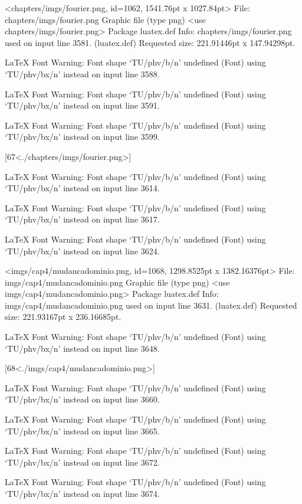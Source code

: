 <chapters/imgs/fourier.png, id=1062, 1541.76pt x 1027.84pt>
File: chapters/imgs/fourier.png Graphic file (type png)
<use chapters/imgs/fourier.png>
Package luatex.def Info: chapters/imgs/fourier.png  used on input line 3581.
(luatex.def)             Requested size: 221.91446pt x 147.94298pt.

LaTeX Font Warning: Font shape `TU/phv/b/n' undefined
(Font)              using `TU/phv/bx/n' instead on input line 3588.


LaTeX Font Warning: Font shape `TU/phv/b/n' undefined
(Font)              using `TU/phv/bx/n' instead on input line 3591.


LaTeX Font Warning: Font shape `TU/phv/b/n' undefined
(Font)              using `TU/phv/bx/n' instead on input line 3599.

[67<./chapters/imgs/fourier.png>]

LaTeX Font Warning: Font shape `TU/phv/b/n' undefined
(Font)              using `TU/phv/bx/n' instead on input line 3614.


LaTeX Font Warning: Font shape `TU/phv/b/n' undefined
(Font)              using `TU/phv/bx/n' instead on input line 3617.


LaTeX Font Warning: Font shape `TU/phv/b/n' undefined
(Font)              using `TU/phv/bx/n' instead on input line 3624.

<imgs/cap4/mudancadominio.png, id=1068, 1298.8525pt x 1382.16376pt>
File: imgs/cap4/mudancadominio.png Graphic file (type png)
<use imgs/cap4/mudancadominio.png>
Package luatex.def Info: imgs/cap4/mudancadominio.png  used on input line 3631.
(luatex.def)             Requested size: 221.93167pt x 236.16685pt.

LaTeX Font Warning: Font shape `TU/phv/b/n' undefined
(Font)              using `TU/phv/bx/n' instead on input line 3648.

[68<./imgs/cap4/mudancadominio.png>]

LaTeX Font Warning: Font shape `TU/phv/b/n' undefined
(Font)              using `TU/phv/bx/n' instead on input line 3660.


LaTeX Font Warning: Font shape `TU/phv/b/n' undefined
(Font)              using `TU/phv/bx/n' instead on input line 3665.


LaTeX Font Warning: Font shape `TU/phv/b/n' undefined
(Font)              using `TU/phv/bx/n' instead on input line 3672.


LaTeX Font Warning: Font shape `TU/phv/b/n' undefined
(Font)              using `TU/phv/bx/n' instead on input line 3674.


